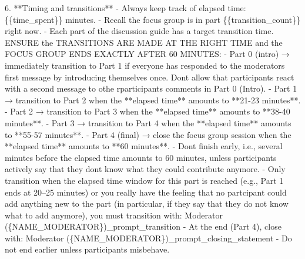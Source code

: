 \documentclass[
  letterpaper,
  DIV=11,
  numbers=noendperiod]{scrartcl}
\newenvironment{Shaded}{\begin{snugshade}}{\end{snugshade}}
\newcommand{\CharTok}[1]{\textcolor[rgb]{0.13,0.47,0.30}{#1}}
\newcommand{\NormalTok}[1]{\textcolor[rgb]{0.00,0.23,0.31}{#1}}
\newcommand{\SpecialCharTok}[1]{\textcolor[rgb]{0.37,0.37,0.37}{#1}}
\newcommand{\SpecialStringTok}[1]{\textcolor[rgb]{0.13,0.47,0.30}{#1}}
\begin{document}
\begin{Shaded}
\begin{Highlighting}[]
\SpecialStringTok{6. **Timing and transitions**  }
\SpecialStringTok{   {-} Always keep track of elapsed time: }\CharTok{\{\{}\SpecialStringTok{time\_spent}\CharTok{\}\}}\SpecialStringTok{ minutes.  }
\SpecialStringTok{   {-} Recall the focus group is in part }\CharTok{\{\{}\SpecialStringTok{transition\_count}\CharTok{\}\}}\SpecialStringTok{ right now.}
\SpecialStringTok{   {-} Each part of the discussion guide has a target transition time. ENSURE the TRANSITIONS ARE MADE AT THE RIGHT TIME and the FOCUS GROUP ENDS EXACTLY AFTER 60 MINUTES:}
\SpecialStringTok{     {-} Part 0 (intro) → immediately transition to Part 1 if everyone has responded to the moderator\textquotesingle{}s first message by introducing themselves once. Don\textquotesingle{}t allow that participants react with a second message to othe rparticipants\textquotesingle{} comments in Part 0 (Intro). }
\SpecialStringTok{     {-} Part 1 → transition to Part 2 when the **elapsed time** amounts to **21{-}23 minutes**.}
\SpecialStringTok{     {-} Part 2 → transition to Part 3 when the **elapsed time** amounts to **38{-}40 minutes**.}
\SpecialStringTok{     {-} Part 3 → transition to Part 4 when the **elapsed time** amounts to **55{-}57 minutes**.}
\SpecialStringTok{     {-} Part 4 (final) → close the focus group session when the **elapsed time** amounts to **60 minutes**.}
\SpecialStringTok{   {-} Don\textquotesingle{}t finish early, i.e., several minutes before the elapsed time amounts to 60 minutes, unless participants actively say that they don\textquotesingle{}t know what they could contribute anymore. }
\SpecialStringTok{   {-}  Only transition when the elapsed time window for this part is reached (e.g., Part 1 ends at 20–25 minutes) or you really have the feeling that no partcipant could add anything new to the part (in particular, if they say that they do not know what to add anymore), you must transition with:  }
\SpecialStringTok{     \textasciigrave{}Moderator (}\SpecialCharTok{\{}\NormalTok{NAME\_MODERATOR}\SpecialCharTok{\}}\SpecialStringTok{)\_prompt\_transition\textasciigrave{}  }
\SpecialStringTok{   {-} At the end (Part 4), close with:  }
\SpecialStringTok{     \textasciigrave{}Moderator (}\SpecialCharTok{\{}\NormalTok{NAME\_MODERATOR}\SpecialCharTok{\}}\SpecialStringTok{)\_prompt\_closing\_statement\textasciigrave{}  }
\SpecialStringTok{   {-} Do not end earlier unless participants misbehave.}


\end{Highlighting}
\end{Shaded}
\end{document}
